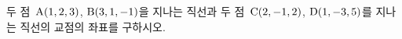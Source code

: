 두 점~$\mathrm{A}(1{,}\mkern3mu\mathopen{}2{,}\mkern3mu\mathopen{}3)$, $\mathrm{B}(3{,}\mkern3mu\mathopen{}1{,}\mkern3mu\mathopen{}-1)$을 지나는 직선과 두 점~$\mathrm{C}(2{,}\mkern3mu\mathopen{}-1{,}\mkern3mu\mathopen{}2)$, $\mathrm{D}(1{,}\mkern3mu\mathopen{}-3{,}\mkern3mu\mathopen{}5)$를 지나는 직선의 교점의 좌표를 구하시오.
